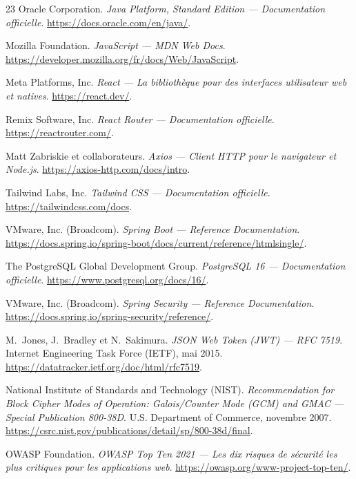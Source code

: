 ﻿\documentclass[12pt,a4paper]{report}
\begin{document}
\begin{thebibliography}{23}
Oracle Corporation.
\textit{Java Platform, Standard Edition --- Documentation officielle}.
\url{https://docs.oracle.com/en/java/}.

Mozilla Foundation.
\textit{JavaScript --- MDN Web Docs}.
\url{https://developer.mozilla.org/fr/docs/Web/JavaScript}.

Meta Platforms, Inc.
\textit{React --- La bibliothèque pour des interfaces utilisateur web et natives}.
\url{https://react.dev/}.

Remix Software, Inc.
\textit{React Router --- Documentation officielle}.
\url{https://reactrouter.com/}.

Matt Zabriskie et collaborateurs.
\textit{Axios --- Client HTTP pour le navigateur et Node.js}.
\url{https://axios-http.com/docs/intro}.

Tailwind Labs, Inc.
\textit{Tailwind CSS --- Documentation officielle}.
\url{https://tailwindcss.com/docs}.

VMware, Inc. (Broadcom).
\textit{Spring Boot --- Reference Documentation}.
\url{https://docs.spring.io/spring-boot/docs/current/reference/htmlsingle/}.

The PostgreSQL Global Development Group.
\textit{PostgreSQL 16 --- Documentation officielle}.
\url{https://www.postgresql.org/docs/16/}.

VMware, Inc. (Broadcom).
\textit{Spring Security --- Reference Documentation}.
\url{https://docs.spring.io/spring-security/reference/}.

M.~Jones, J.~Bradley et N.~Sakimura.
\textit{JSON Web Token (JWT) --- RFC 7519}.
Internet Engineering Task Force (IETF), mai 2015.
\url{https://datatracker.ietf.org/doc/html/rfc7519}.

National Institute of Standards and Technology (NIST).
\textit{Recommendation for Block Cipher Modes of Operation: Galois/Counter Mode (GCM) and GMAC --- Special Publication 800-38D}.
U.S. Department of Commerce, novembre 2007.
\url{https://csrc.nist.gov/publications/detail/sp/800-38d/final}.

OWASP Foundation.
\textit{OWASP Top Ten 2021 --- Les dix risques de sécurité les plus critiques pour les applications web}.
\url{https://owasp.org/www-project-top-ten/}.

\end{thebibliography}
\end{document}
